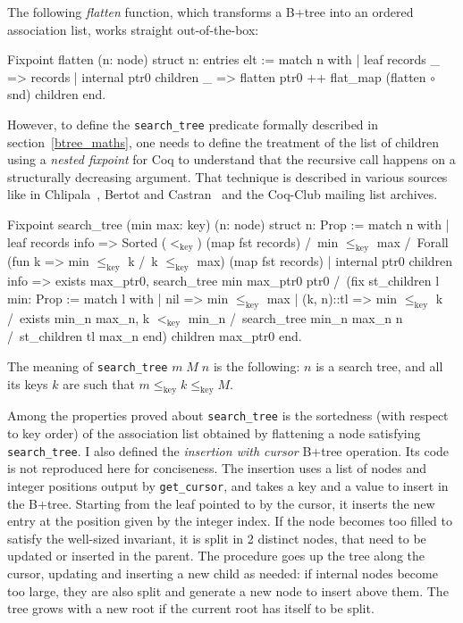 \documentclass[11pt]{article}
\def\coqe{\lstinline[language=Coq, basicstyle=\small]}
\begin{document}
The following \emph{flatten} function, which transforms a B+tree into an ordered association list, works straight out-of-the-box:
\begin{coq}
Fixpoint flatten (n: node) {struct n}: entries elt :=
match n with
| leaf records _ => records
| internal ptr0 children _ => flatten ptr0 ++ flat_map (flatten $\circ$ snd) children
end.
\end{coq}

However, to define the \coqe{search_tree} predicate formally described in section~\ref{btree_maths},
one needs to define the treatment of the list of children using a \emph{nested fixpoint} for Coq to understand that the recursive call happens on a structurally decreasing argument.
That technique is described in various sources like in Chlipala~\cite{CPDT}, Bertot and Castran~\cite{CoqArt} and the Coq-Club mailing list archives. 
\begin{coq}
Fixpoint search_tree (min max: key) (n: node) {struct n}: Prop :=
match n with
| leaf records info => Sorted ($<_\mathrm{key}$) (map fst records) /\
    min $\le_\mathrm{key}$ max /\
    Forall (fun k => min $\le_\mathrm{key}$ k /\ k $\le_\mathrm{key}$ max) (map fst records)
| internal ptr0 children info => exists max_ptr0,
    search_tree min max_ptr0 ptr0 /\
    (fix st_children l min: Prop :=
    match l with
    | nil => min $\le_\mathrm{key}$ max
    | (k, n)::tl =>
        min $\le_\mathrm{key}$ k /\
        exists min_n max_n,
          k $<_\mathrm{key}$ min_n /\
          search_tree min_n max_n n /\
          st_children tl max_n
        end) children max_ptr0
    end.
\end{coq}

The meaning of \coqe{search_tree} $m\;M\;n$ is the following: $n$ is a search tree, and all its keys $k$ are such that $m \le_\mathrm{key} k \le_\mathrm{key} M$.

Among the properties proved about \coqe{search_tree} is the sortedness (with respect to key order) of the association list obtained by flattening a node satisfying \coqe{search_tree}.
I also defined the \emph{insertion with cursor} B+tree operation. Its code is not reproduced here for conciseness.
The insertion uses a list of nodes and integer positions output by \coqe{get_cursor}, and takes a key and a value to insert in the B+tree.
Starting from the leaf pointed to by the cursor, it inserts the new entry at the position given by the integer index.
If the node becomes too filled to satisfy the well-sized invariant, it is split in 2 distinct nodes, that need to be updated or inserted in the parent.
The procedure goes up the tree along the cursor, updating and inserting a new child as needed:
if internal nodes become too large, they are also split and generate a new node to insert above them.
The tree grows with a new root if the current root has itself to be split.
\end{document}
